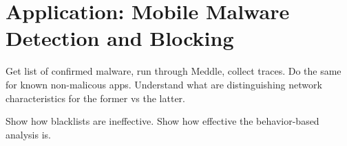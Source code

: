 \section{Application: Mobile Malware \\
Detection and Blocking}
\label{sec:malware}

%
%
%


Get list of confirmed malware, run through Meddle, collect traces. Do the same for known non-malicous apps. 
Understand what are distinguishing network characteristics for the former vs the latter. 

Show how blacklists are ineffective. Show how effective the behavior-based analysis is.

%
